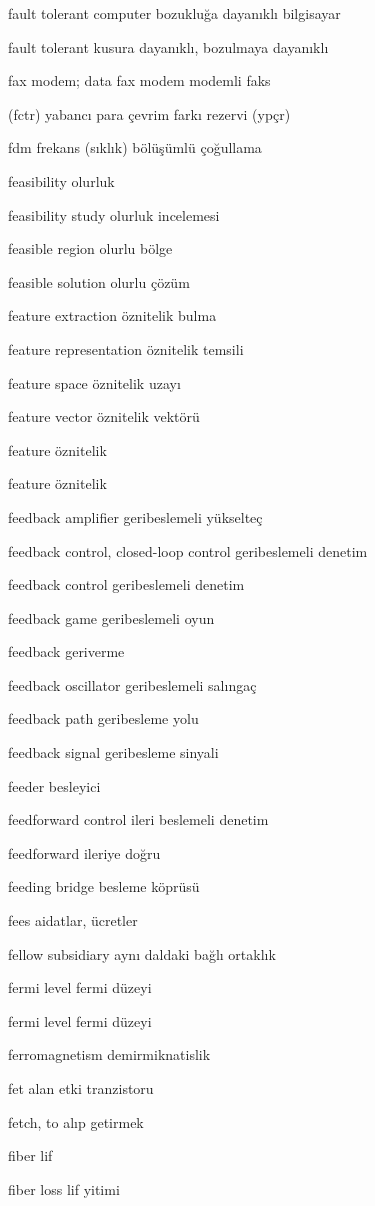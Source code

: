 \documentclass[12pt,fleqn]{article}\usepackage{../../common}
\begin{document}
fault tolerant computer bozukluğa dayanıklı bilgisayar

fault tolerant kusura dayanıklı, bozulmaya dayanıklı

fax modem; data fax modem modemli faks

(fctr) yabancı para çevrim farkı rezervi (ypçr)

fdm frekans (sıklık) bölüşümlü çoğullama

feasibility olurluk

feasibility study olurluk incelemesi

feasible region olurlu bölge

feasible solution olurlu çözüm

feature extraction öznitelik bulma

feature representation öznitelik temsili

feature space öznitelik uzayı

feature vector öznitelik vektörü

feature öznitelik

feature öznitelik

feedback amplifier geribeslemeli yükselteç

feedback control, closed-loop control geribeslemeli denetim

feedback control geribeslemeli denetim

feedback game geribeslemeli oyun

feedback geriverme

feedback oscillator geribeslemeli salıngaç

feedback path geribesleme yolu

feedback signal geribesleme sinyali

feeder besleyici

feedforward control ileri beslemeli denetim

feedforward ileriye doğru

feeding bridge besleme köprüsü

fees aidatlar, ücretler

fellow subsidiary aynı daldaki bağlı ortaklık

fermi level fermi düzeyi

fermi level fermi düzeyi

ferromagnetism demirmiknatislik

fet alan etki tranzistoru

fetch, to alıp getirmek

fiber lif

fiber loss lif yitimi
\end{document}
